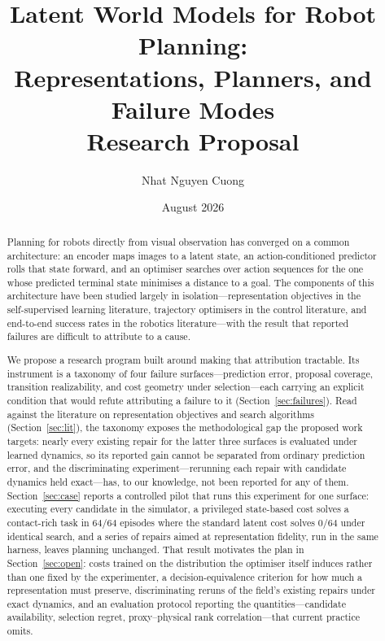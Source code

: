 \documentclass[11pt,letterpaper]{article}
\title{\textbf{Latent World Models for Robot Planning:}\\[2pt]
\textbf{Representations, Planners, and Failure Modes}\\[6pt]
\large Research Proposal}
\author{Nhat Nguyen Cuong}
\date{August 2026}
\begin{document}
\maketitle

\begin{abstract}
\noindent
Planning for robots directly from visual observation has converged on a common
architecture: an encoder maps images to a latent state, an action-conditioned
predictor rolls that state forward, and an optimiser searches over action
sequences for the one whose predicted terminal state minimises a distance to a
goal. The components of this architecture have been studied largely in
isolation---representation objectives in the self-supervised learning
literature, trajectory optimisers in the control literature, and end-to-end
success rates in the robotics literature---with the result that reported
failures are difficult to attribute to a cause.

We propose a research program built around making that attribution tractable.
Its instrument is a taxonomy of four failure surfaces---prediction error,
proposal coverage, transition realizability, and cost geometry under
selection---each carrying an explicit condition that would refute attributing a
failure to it (Section~\ref{sec:failures}). Read against the literature on
representation objectives and search algorithms (Section~\ref{sec:lit}), the
taxonomy exposes the methodological gap the proposed work targets: nearly every
existing repair for the latter three surfaces is evaluated under learned
dynamics, so its reported gain cannot be separated from ordinary prediction
error, and the discriminating experiment---rerunning each repair with candidate
dynamics held exact---has, to our knowledge, not been reported for any of them.
Section~\ref{sec:case} reports a controlled pilot that runs this experiment for
one surface: executing every candidate in the simulator, a privileged
state-based cost solves a contact-rich task in $64/64$ episodes where the
standard latent cost solves $0/64$ under identical search, and a series of
repairs aimed at representation fidelity, run in the same harness, leaves
planning unchanged. That result motivates the plan in Section~\ref{sec:open}:
costs trained on the distribution the optimiser itself induces rather than one
fixed by the experimenter, a decision-equivalence criterion for how much a
representation must preserve, discriminating reruns of the field's existing
repairs under exact dynamics, and an evaluation protocol reporting the
quantities---candidate availability, selection regret, proxy--physical rank
correlation---that current practice omits.
\end{abstract}
\end{document}
